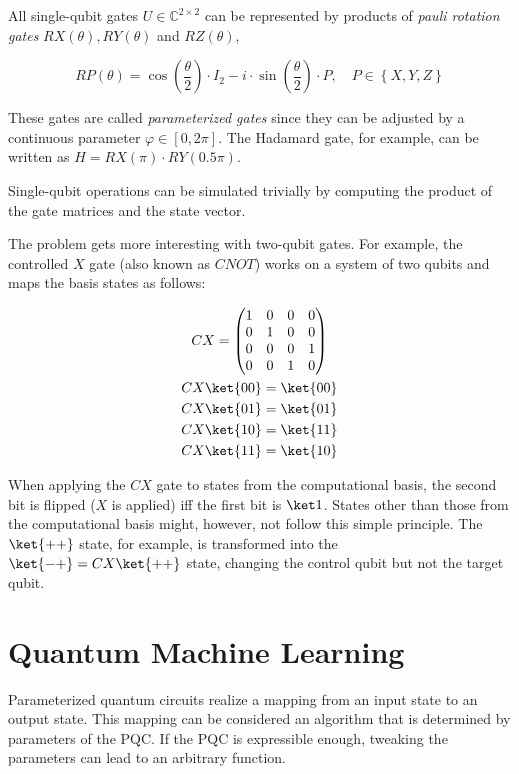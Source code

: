 All single-qubit gates $U \in \mathbb{C}^{2 \times 2}$ can be represented by
products of \emph{pauli rotation gates} $RX(\theta), RY(\theta)$ and
$RZ(\theta)$,

\begin{equation}
    \label{eq:rotational-pauli-gates}
    RP\left(\theta\right) = \cos\left(\frac\theta2\right) \cdot I_2 - i \cdot \sin\left(\frac\theta2\right) \cdot P,\quad
    P \in \left\{X, Y, Z\right\}
\end{equation}

These gates are called \emph{parameterized gates} since they can be adjusted by a
continuous parameter $\varphi \in \left[0, 2\pi\right]$.
The Hadamard gate, for example, can be written as
$H = RX(\pi) \cdot RY(0.5\pi)$.

Single-qubit operations can be simulated trivially by computing the product of
the gate matrices and the state vector.

The problem gets more interesting with two-qubit gates.
For example, the controlled $X$ gate (also known as $CNOT$) works on a system
of two qubits and maps the basis states as follows:

\begin{gather}
    \label{eq:cx-zbasis}
    CX = \begin{pmatrix}
        1&0&0&0\\
        0&1&0&0\\
        0&0&0&1\\
        0&0&1&0
    \end{pmatrix}\\
    CX \ket{00} = \ket{00}\\
    CX \ket{01} = \ket{01}\\
    CX \ket{10} = \ket{11}\\
    CX \ket{11} = \ket{10}
\end{gather}

When applying the $CX$ gate to states from the computational basis, the second
bit is flipped ($X$ is applied) iff the first bit is $\ket 1$.
States other than those from the computational basis might, however, not follow
this simple principle.
The $\ket{++}$ state, for example, is transformed into the
$\ket{-+} = CX \ket{++}$ state, changing the control qubit but not the target
qubit.

\section{Quantum Machine Learning}
Parameterized quantum circuits realize a mapping from an input state to an
output state.
This mapping can be considered an algorithm that is determined by parameters of
the PQC.
If the PQC is expressible enough, tweaking the parameters can lead to an
arbitrary function.

